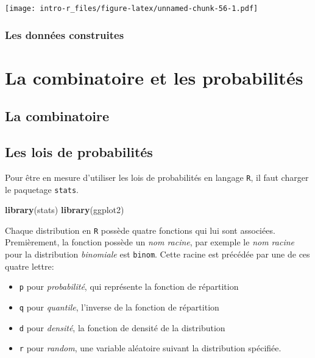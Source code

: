 \documentclass[]{book}
\newenvironment{Shaded}{\begin{snugshade}}{\end{snugshade}}
\newcommand{\KeywordTok}[1]{\textcolor[rgb]{0.13,0.29,0.53}{\textbf{#1}}}
\newcommand{\NormalTok}[1]{#1}
\providecommand{\tightlist}{%
  \setlength{\itemsep}{0pt}\setlength{\parskip}{0pt}}
\begin{document}
\texttt{[image: intro-r\_files/figure-latex/unnamed-chunk-56-1.pdf]}

\section{Les données construites}\label{les-donnees-construites}

\part{La combinatoire et les
probabilités}\label{part-la-combinatoire-et-les-probabilites}

\chapter{La combinatoire}\label{la-combinatoire}

\chapter{Les lois de probabilités}\label{les-lois-de-probabilites}

Pour être en mesure d'utiliser les lois de probabilités en langage
\texttt{R}, il faut charger le paquetage \texttt{stats}.

\begin{Shaded}
\begin{Highlighting}[]
\KeywordTok{library}\NormalTok{(stats)}
\KeywordTok{library}\NormalTok{(ggplot2)}
\end{Highlighting}
\end{Shaded}

Chaque distribution en \texttt{R} possède quatre fonctions qui lui sont
associées. Premièrement, la fonction possède un \emph{nom racine}, par
exemple le \emph{nom racine} pour la distribution \emph{binomiale} est
\texttt{binom}. Cette racine est précédée par une de ces quatre lettre:

\begin{itemize}
\tightlist
\item
  \texttt{p} pour \emph{probabilité}, qui représente la fonction de
  répartition
\item
  \texttt{q} pour \emph{quantile}, l'inverse de la fonction de
  répartition
\item
  \texttt{d} pour \emph{densité}, la fonction de densité de la
  distribution
\item
  \texttt{r} pour \emph{random}, une variable aléatoire suivant la
  distribution spécifiée.
\end{itemize}
\end{document}

